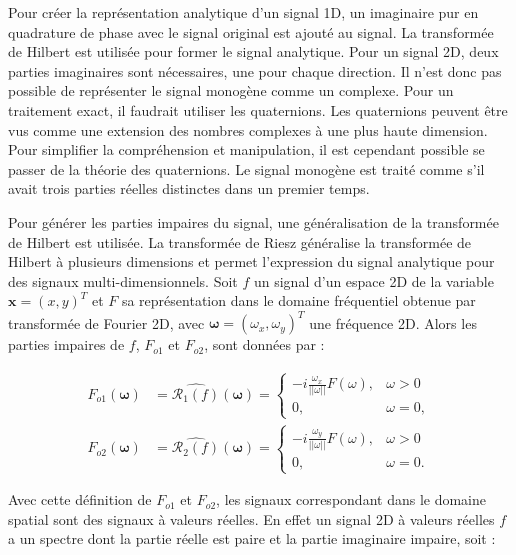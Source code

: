 Pour créer la représentation analytique d'un signal 1D, un imaginaire pur en quadrature de phase avec le signal original est ajouté au signal. La transformée de Hilbert est utilisée pour former le signal analytique. Pour un signal 2D, deux parties imaginaires sont nécessaires, une pour chaque direction. Il n'est donc pas possible de représenter le signal monogène comme un complexe. Pour un traitement exact, il faudrait utiliser les quaternions. Les quaternions peuvent être vus comme une extension des nombres complexes à une plus haute dimension. Pour simplifier la compréhension et manipulation, il est cependant possible se passer de la théorie des quaternions. Le signal monogène est traité comme s'il avait trois parties réelles distinctes dans un premier temps.

\bigskip

Pour générer les parties impaires du signal, une généralisation de la transformée de Hilbert est utilisée. La \og transformée de Riesz \fg généralise la transformée de Hilbert à plusieurs dimensions et permet l'expression du signal analytique pour des signaux multi-dimensionnels. Soit $f$ un signal d'un espace 2D de la variable $\mathbf{x} = (x, y)^T$ et $F$ sa représentation dans le domaine fréquentiel obtenue par transformée de Fourier 2D, avec $\mathbf{\omega}=(\omega_x, \omega_y)^T$ une fréquence 2D. Alors les parties impaires de $f$, $F_{o1}$ et $F_{o2}$, sont données par :

\begin{align}
    F_{o1}(\mathbf{\omega}) &= \widehat{\mathcal{R}_1(f)}(\mathbf{\omega}) =
        \left\{
        \begin{array}{ll}
            -i\frac{\omega_x}{||\omega||}F(\omega), & \omega > 0 \\
            0, & \omega = 0,
        \end{array}
        \right. \\
    F_{o2}(\mathbf{\omega}) &= \widehat{\mathcal{R}_2(f)}(\mathbf{\omega}) =
        \left\{
        \begin{array}{ll}
            -i\frac{\omega_y}{||\omega||}F(\omega), & \omega > 0 \\
            0, & \omega = 0.
        \end{array}
        \right.
    \label{eq:2.20}
\end{align}

Avec cette définition de $F_{o1}$ et $F_{o2}$, les signaux correspondant dans le domaine spatial sont des signaux à valeurs réelles. En effet un signal 2D à valeurs réelles $f$ a un spectre dont la partie réelle est paire et la partie imaginaire impaire, soit :

